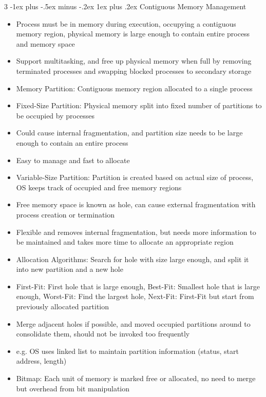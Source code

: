 \documentclass[10pt, landscape]{article}
\makeatletter
\renewcommand{\subsection}{\@startsection{subsection}{3}{0mm}%
                                {-1ex plus -.5ex minus -.2ex}%
                                {1ex plus .2ex}%
                                {\normalfont\small\bfseries}}%
\makeatother
\begin{document}
\begin{multicols*}{3}
\subsection{Contiguous Memory Management}
\begin{itemize}
    \item Process must be in memory during execution, occupying a contiguous memory region, physical memory is large enough to contain entire process and memory space
    \item Support multitasking, and free up physical memory when full by removing terminated processes and swapping blocked processes to secondary storage
    \item Memory Partition: Contiguous memory region allocated to a single process
    \item Fixed-Size Partition: Physical memory split into fixed number of partitions to be occupied by processes
    \item Could cause internal fragmentation, and partition size needs to be large enough to contain an entire process
    \item Easy to manage and fast to allocate
    \item Variable-Size Partition: Partition is created based on actual size of process, OS keeps track of occupied and free memory regions
    \item Free memory space is known as hole, can cause external fragmentation with process creation or termination
    \item Flexible and removes internal fragmentation, but needs more information to be maintained and takes more time to allocate an appropriate region
    \item Allocation Algorithms: Search for hole with size large enough, and split it into new partition and a new hole
    \item First-Fit: First hole that is large enough, Best-Fit: Smallest hole that is large enough, Worst-Fit: Find the largest hole, Next-Fit: First-Fit but start from previously allocated partition
    \item Merge adjacent holes if possible, and moved occupied partitions around to consolidate them, should not be invoked too frequently
    \item e.g. OS uses linked list to maintain partition information (status, start address, length)
    \item Bitmap: Each unit of memory is marked free or allocated, no need to merge but overhead from bit manipulation
\end{itemize}


\end{multicols*}
\end{document}
